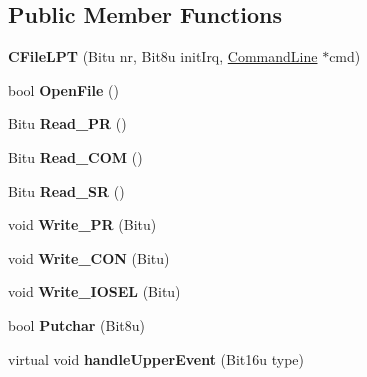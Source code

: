 \subsection*{Public Member Functions}
\begin{DoxyCompactItemize}
\item 
\hypertarget{classCFileLPT_a4283c6ee323ae064a1ec081487900bd0}{{\bfseries C\-File\-L\-P\-T} (Bitu nr, Bit8u init\-Irq, \hyperlink{classCommandLine}{Command\-Line} $\ast$cmd)}\label{classCFileLPT_a4283c6ee323ae064a1ec081487900bd0}

\item 
\hypertarget{classCFileLPT_a4d06c86f7311d6cf8fc6e11b420ad6ef}{bool {\bfseries Open\-File} ()}\label{classCFileLPT_a4d06c86f7311d6cf8fc6e11b420ad6ef}

\item 
\hypertarget{classCFileLPT_afc66bf11689e4aa9fa2206c5e147000c}{Bitu {\bfseries Read\-\_\-\-P\-R} ()}\label{classCFileLPT_afc66bf11689e4aa9fa2206c5e147000c}

\item 
\hypertarget{classCFileLPT_afcf8b593cc34eaafe8c93b0c3270804a}{Bitu {\bfseries Read\-\_\-\-C\-O\-M} ()}\label{classCFileLPT_afcf8b593cc34eaafe8c93b0c3270804a}

\item 
\hypertarget{classCFileLPT_adf5e9bcd0026bf2fab83a6bdd15f3330}{Bitu {\bfseries Read\-\_\-\-S\-R} ()}\label{classCFileLPT_adf5e9bcd0026bf2fab83a6bdd15f3330}

\item 
\hypertarget{classCFileLPT_a65b07a710e2d2f17c035bb93e9ae59e7}{void {\bfseries Write\-\_\-\-P\-R} (Bitu)}\label{classCFileLPT_a65b07a710e2d2f17c035bb93e9ae59e7}

\item 
\hypertarget{classCFileLPT_ac963dd0328b926c419f8cc8bc79f8177}{void {\bfseries Write\-\_\-\-C\-O\-N} (Bitu)}\label{classCFileLPT_ac963dd0328b926c419f8cc8bc79f8177}

\item 
\hypertarget{classCFileLPT_af12ad77ab97a96bdbe07a9566659673d}{void {\bfseries Write\-\_\-\-I\-O\-S\-E\-L} (Bitu)}\label{classCFileLPT_af12ad77ab97a96bdbe07a9566659673d}

\item 
\hypertarget{classCFileLPT_a09595c3a5a7bc8e9c0625cd951330172}{bool {\bfseries Putchar} (Bit8u)}\label{classCFileLPT_a09595c3a5a7bc8e9c0625cd951330172}

\item 
\hypertarget{classCFileLPT_ac3a5bf3dc1b7362fb909b153febf8b88}{virtual void {\bfseries handle\-Upper\-Event} (Bit16u type)}\label{classCFileLPT_ac3a5bf3dc1b7362fb909b153febf8b88}

\end{DoxyCompactItemize}
